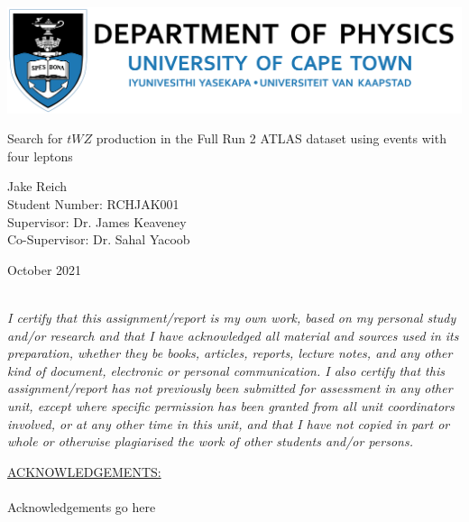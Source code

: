 \documentclass[]{article}
\begin{document}
\thispagestyle{empty}
\begin{center}
	\begin{minipage}{0.75\linewidth}
		\centering
		\includegraphics[width=1\linewidth]{deptPhysics.jpg}\\
		\par
		\vspace{3cm}
		{{\Large Search for $tWZ$ production in the Full Run 2 ATLAS dataset using events with four leptons\par}}
		\vspace{3cm}
		{\Large Jake Reich\\Student Number: RCHJAK001 \\Supervisor: Dr. James Keaveney \\ Co-Supervisor: Dr. Sahal Yacoob\par}
		\vspace{8cm}
		{\Large October 2021}
	\end{minipage}
\end{center}
\clearpage

\vfill
~\\
\textit{I certify that this assignment/report is my own work, based on my personal study and/or research and that I have acknowledged all material and sources used in its preparation, whether they be books, articles, reports, lecture notes, and any other kind of document, electronic or personal communication. I also certify that this assignment/report has not previously been submitted for assessment in any other unit, except where specific permission has been granted from all unit coordinators involved, or at any other time in this unit, and that I have not copied in part or whole or otherwise plagiarised the work of other students and/or persons.}

\clearpage

\tableofcontents

\vfill
\underline{ACKNOWLEDGEMENTS:}\\\\
Acknowledgements go here
\clearpage

\begin{abstract}

\end{abstract}
\end{document}
